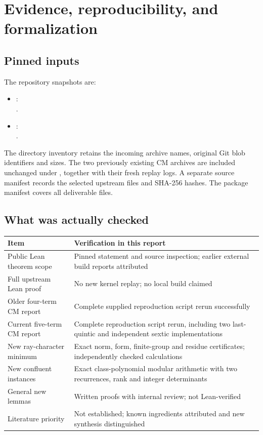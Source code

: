 \section{Evidence, reproducibility, and formalization}

\subsection{Pinned inputs}

The repository snapshots are:
\begin{itemize}
\item {}:\\
.
\item {}:\\
.
\end{itemize}
The directory inventory retains the incoming archive names, original Git blob identifiers and sizes. The two previously existing CM archives are included unchanged under , together with their fresh replay logs. A separate source manifest records the selected upstream files and SHA-256 hashes. The package manifest covers all deliverable files.

\subsection{What was actually checked}

\begin{center}
\small
\begin{tabular}{p{.34\linewidth}p{.57\linewidth}}
\toprule
Item & Verification in this report\\
\midrule
Public Lean theorem scope & Pinned statement and source inspection; earlier external build reports attributed\\
Full upstream Lean proof & No new kernel replay; no local build claimed\\
Older four-term CM report & Complete supplied reproduction script rerun successfully\\
Current five-term CM report & Complete reproduction script rerun, including two last-quintic and independent sextic implementations\\
New ray-character minimum & Exact norm, form, finite-group and residue certificates; independently checked calculations\\
New confluent instances & Exact class-polynomial modular arithmetic with two recurrences, rank and integer determinants\\
General new lemmas & Written proofs with internal review; not Lean-verified\\
Literature priority & Not established; known ingredients attributed and new synthesis distinguished\\
\bottomrule
\end{tabular}
\end{center}

